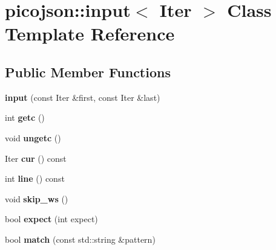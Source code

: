 \hypertarget{classpicojson_1_1input}{\section{picojson\-:\-:input$<$ Iter $>$ Class Template Reference}
\label{classpicojson_1_1input}
}
\subsection*{Public Member Functions}
\begin{DoxyCompactItemize}
\item 
\hypertarget{classpicojson_1_1input_ab1ca217622d921118707de9e9011a62f}{{\bfseries input} (const Iter \&first, const Iter \&last)}\label{classpicojson_1_1input_ab1ca217622d921118707de9e9011a62f}

\item 
\hypertarget{classpicojson_1_1input_a3e8ba0b09a989efa0dc583096984ea8e}{int {\bfseries getc} ()}\label{classpicojson_1_1input_a3e8ba0b09a989efa0dc583096984ea8e}

\item 
\hypertarget{classpicojson_1_1input_a96ccc244e73b2ab87ded38c98e98d573}{void {\bfseries ungetc} ()}\label{classpicojson_1_1input_a96ccc244e73b2ab87ded38c98e98d573}

\item 
\hypertarget{classpicojson_1_1input_abb0bb5b0fdf2604bcdbb65406dc773ca}{Iter {\bfseries cur} () const }\label{classpicojson_1_1input_abb0bb5b0fdf2604bcdbb65406dc773ca}

\item 
\hypertarget{classpicojson_1_1input_a24faf1a7e714ee88a4fb43ec4fc7164a}{int {\bfseries line} () const }\label{classpicojson_1_1input_a24faf1a7e714ee88a4fb43ec4fc7164a}

\item 
\hypertarget{classpicojson_1_1input_aa83aefe87374a5e24ab8c8e80fef4aa4}{void {\bfseries skip\-\_\-ws} ()}\label{classpicojson_1_1input_aa83aefe87374a5e24ab8c8e80fef4aa4}

\item 
\hypertarget{classpicojson_1_1input_a14c29e99d9c9aa8cdbb46178c434d663}{bool {\bfseries expect} (int expect)}\label{classpicojson_1_1input_a14c29e99d9c9aa8cdbb46178c434d663}

\item 
\hypertarget{classpicojson_1_1input_ad15f360122daf49ddf7a2a8591fa4364}{bool {\bfseries match} (const std\-::string \&pattern)}\label{classpicojson_1_1input_ad15f360122daf49ddf7a2a8591fa4364}

\end{DoxyCompactItemize}
